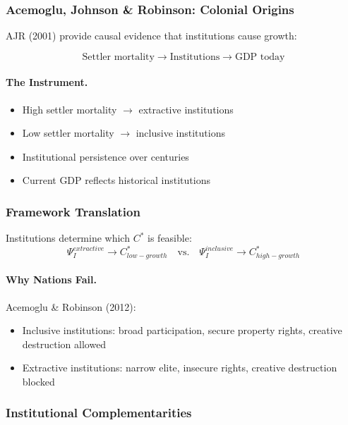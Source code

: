 \subsubsection{Acemoglu, Johnson \& Robinson: Colonial Origins}

AJR (2001) provide causal evidence that institutions cause growth:

\begin{equation}
\boxed{
\text{Settler mortality} \to \text{Institutions} \to \text{GDP today}
}
\label{eq:ajr}
\end{equation}

\paragraph{The Instrument.}
\begin{itemize}
    \item High settler mortality $\to$ extractive institutions
    \item Low settler mortality $\to$ inclusive institutions
    \item Institutional persistence over centuries
    \item Current GDP reflects historical institutions
\end{itemize}

\subsubsection{Framework Translation}

Institutions determine which $C^*$ is feasible:
\begin{equation}
\Psi_I^{extractive} \to C^*_{low-growth} \quad \text{vs.} \quad 
\Psi_I^{inclusive} \to C^*_{high-growth}
\end{equation}

\paragraph{Why Nations Fail.}
Acemoglu \& Robinson (2012):
\begin{itemize}
    \item Inclusive institutions: broad participation, secure property rights, creative destruction allowed
    \item Extractive institutions: narrow elite, insecure rights, creative destruction blocked
\end{itemize}

\subsubsection{Institutional Complementarities}

